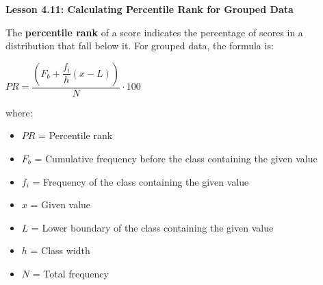 \begin{center}
\textbf{Lesson 4.11: Calculating Percentile Rank for Grouped Data}
\end{center}

\vspace*{-1.5ex}

The \textbf{percentile rank} of a score indicates the percentage of scores in a distribution that fall below it. For grouped data, the formula is:  

{\centering $PR = \dfrac{\left(F_b + \dfrac{f_i}{h} (x - L)\right)}{N} \cdot 100 $\par}

where:  
\begin{itemize}
    \item \(PR\) = Percentile rank  
    \item \(F_b\) = Cumulative frequency before the class containing the given value  
    \item \(f_i\) = Frequency of the class containing the given value  
    \item \(x\) = Given value  
    \item \(L\) = Lower boundary of the class containing the given value  
    \item \(h\) = Class width
    \item \(N\) = Total frequency  
\end{itemize}

